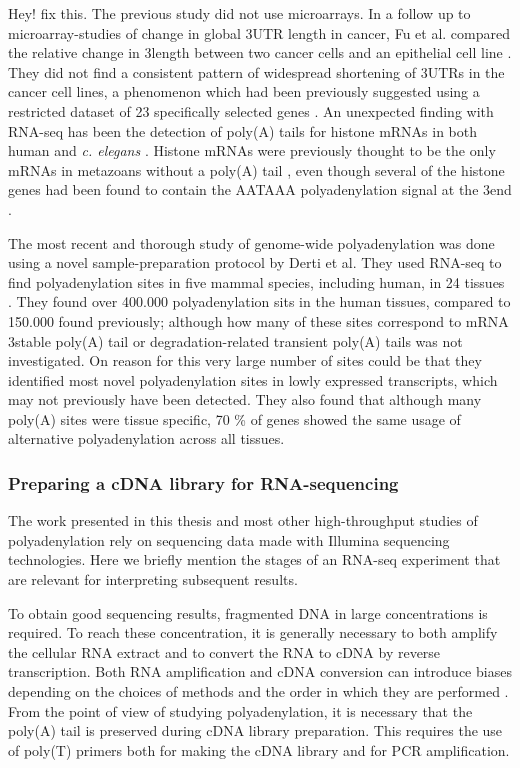 Hey! fix this. The previous study did not use microarrays.
In a
follow up to microarray-studies of change in global 3\p UTR length in cancer,
Fu et al. compared the relative change in 3\p length between two cancer cells
and an epithelial cell line \cite{fu_differential_2011}. They did not find a
consistent pattern of widespread shortening of 3\p UTRs in the cancer cell
lines, a phenomenon which had been previously suggested using a restricted
dataset of 23 specifically selected genes \cite{mayr_widespread_2009-2}. An
unexpected finding with RNA-seq has been the detection of poly(A) tails for
histone mRNAs in both human and \textit{c.  elegans}
\cite{mangone_landscape_2010-1, shepard_complex_2011}.  Histone mRNAs were
previously thought to be the only mRNAs in metazoans without a poly(A) tail
\cite{marzluff_metabolism_2008}, even though several of the histone genes had
been found to contain the AATAAA polyadenylation signal at the 3\p end
\cite{keall_histone_2007}.

The most recent and thorough study of genome-wide polyadenylation was done
using a novel sample-preparation protocol by Derti et al. They used RNA-seq to
find polyadenylation sites in five mammal species, including human, in 24
tissues \cite{derti_quantitative_2012}. They found over 400.000 polyadenylation
sits in the human tissues, compared to 150.000 found previously; although how
many of these sites correspond to mRNA 3\p stable poly(A) tail or
degradation-related transient poly(A) tails was not investigated. On reason for
this very large number of sites could be that they identified most novel
polyadenylation sites in lowly expressed transcripts, which may not previously
have been detected. They also found that although many poly(A) sites were
tissue specific, 70 \% of genes showed the same usage of alternative
polyadenylation across all tissues.

\subsubsection{Preparing a cDNA library for RNA-sequencing}
The work presented in this thesis and most other high-throughput studies of
polyadenylation rely on sequencing data made with Illumina sequencing
technologies. Here we briefly mention the stages of an RNA-seq
experiment that are relevant for interpreting subsequent results.

To obtain good sequencing results, fragmented DNA in large concentrations is
required. To reach these concentration, it is generally necessary to both
amplify the cellular RNA extract and to convert the RNA to cDNA by reverse
transcription. Both RNA amplification and cDNA conversion can introduce biases
depending on the choices of methods and the order in which they are performed
\cite{wang_rna-seq:_2009}. From the point of view of studying polyadenylation,
it is necessary that the poly(A) tail is preserved during cDNA library
preparation. This requires the use of poly(T) primers both for making the cDNA
library and for PCR amplification.

